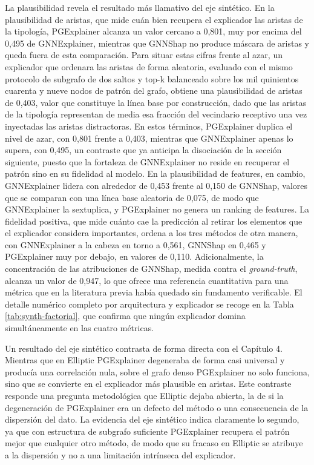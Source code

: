 La plausibilidad revela el resultado más llamativo del eje sintético. En la plausibilidad de aristas, que mide cuán bien recupera el explicador las aristas de la tipología, PGExplainer alcanza un valor cercano a 0,801, muy por encima del 0,495 de GNNExplainer, mientras que GNNShap no produce máscara de aristas y queda fuera de esta comparación. Para situar estas cifras frente al azar, un explicador que ordenara las aristas de forma aleatoria, evaluado con el mismo protocolo de subgrafo de dos saltos y top-k balanceado sobre los mil quinientos cuarenta y nueve nodos de patrón del grafo, obtiene una plausibilidad de aristas de 0,403, valor que constituye la línea base por construcción, dado que las aristas de la tipología representan de media esa fracción del vecindario receptivo una vez inyectadas las aristas distractoras. En estos términos, PGExplainer duplica el nivel de azar, con 0,801 frente a 0,403, mientras que GNNExplainer apenas lo supera, con 0,495, un contraste que ya anticipa la disociación de la sección siguiente, puesto que la fortaleza de GNNExplainer no reside en recuperar el patrón sino en su fidelidad al modelo. En la plausibilidad de features, en cambio, GNNExplainer lidera con alrededor de 0,453 frente al 0,150 de GNNShap, valores que se comparan con una línea base aleatoria de 0,075, de modo que GNNExplainer la sextuplica, y PGExplainer no genera un ranking de features. La fidelidad positiva, que mide cuánto cae la predicción al retirar los elementos que el explicador considera importantes, ordena a los tres métodos de otra manera, con GNNExplainer a la cabeza en torno a 0,561, GNNShap en 0,465 y PGExplainer muy por debajo, en valores de 0,110. Adicionalmente, la concentración de las atribuciones de GNNShap, medida contra el \textit{ground-truth}, alcanza un valor de 0,947, lo que ofrece una referencia cuantitativa para una métrica que en la literatura previa había quedado sin fundamento verificable. El detalle numérico completo por arquitectura y explicador se recoge en la Tabla \ref{tab:synth-factorial}, que confirma que ningún explicador domina simultáneamente en las cuatro métricas.



Un resultado del eje sintético contrasta de forma directa con el Capítulo 4. Mientras que en Elliptic PGExplainer degeneraba de forma casi universal y producía una correlación nula, sobre el grafo denso PGExplainer no solo funciona, sino que se convierte en el explicador más plausible en aristas. Este contraste responde una pregunta metodológica que Elliptic dejaba abierta, la de si la degeneración de PGExplainer era un defecto del método o una consecuencia de la dispersión del dato. La evidencia del eje sintético indica claramente lo segundo, ya que con estructura de subgrafo suficiente PGExplainer recupera el patrón mejor que cualquier otro método, de modo que su fracaso en Elliptic se atribuye a la dispersión y no a una limitación intrínseca del explicador.

